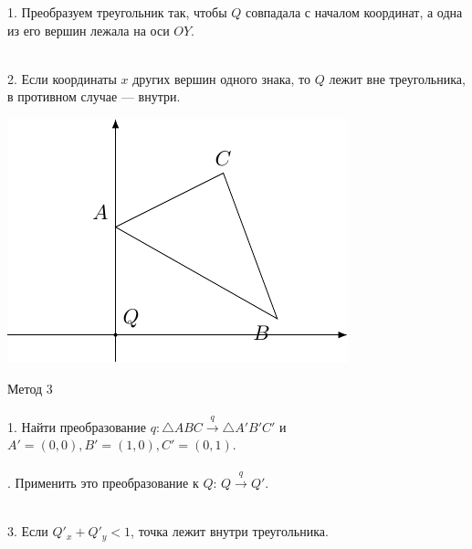 \documentclass[10pt]{beamer}
\begin{document}
{{		1. Преобразуем треугольник так, чтобы $Q$ совпадала с началом координат, а одна из его вершин лежала на оси $OY$. 	\\ ~ \\	
		
		\pause
		
		
		2. Если координаты $x$ других вершин одного знака, то  $Q$ лежит вне треугольника, в противном случае  --- внутри. 	

	}
}

{
	{
		\includegraphics[page=5]{triangle2.pdf} 

	}
	{
		Метод 3 \\ ~ \\
		
		1. Найти преобразование $q: \triangle ABC \xrightarrow{q} \triangle A'B'C'$ и $A'=(0,0), B'=(1,0), C'=(0,1) $. 	\\ ~ \\
		
		. Применить это преобразование к $Q$: $Q \xrightarrow{q} Q'$. \\ ~ \\
		
		\pause
		
		3. Если $Q '_x+Q '_y < 1$, точка лежит внутри треугольника.
		
	}
	
	
}

	
\end{document}
